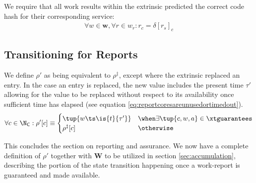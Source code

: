 We require that all work results within the extrinsic predicted the correct code hash for their corresponding service:
\begin{align}\label{eq:reportcodesarecorrect}
  \forall w \in \mathbf{w}, \forall r \in w_r : r_c = \delta[r_s]_c
\end{align}









\subsection{Transitioning for Reports}

We define $\rho'$ as being equivalent to $\rho^\ddagger$, except where the extrinsic replaced an entry. In the case an entry is replaced, the new value includes the present time $\tau'$ allowing for the value to be replaced without respect to its availability once sufficient time has elapsed (see equation \ref{eq:reportcoresareunusedortimedout}).
\begin{equation}
    \forall c \in \N_\mathsf{C} : \rho'[c] \equiv \begin{cases}
      \tup{w\ts\is{t}{\tau'}} &\when \exists \tup{c, w, a} \in \xtguarantees \\
      \rho^\ddagger[c] &\otherwise
    \end{cases}
\end{equation}

This concludes the section on reporting and assurance. We now have a complete definition of $\rho'$ together with $\mathbf{W}$ to be utilized in section \ref{sec:accumulation}, describing the portion of the state transition happening once a work-report is guaranteed and made available.
